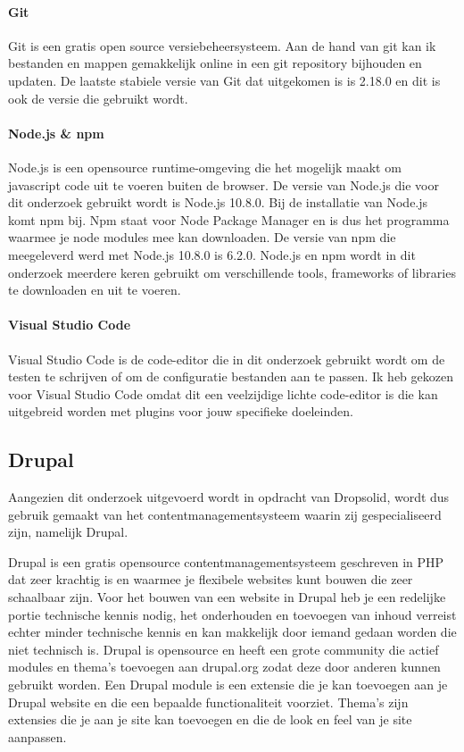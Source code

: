 \paragraph{Git}
Git is een gratis open source versiebeheersysteem. Aan de hand van git kan ik bestanden en mappen gemakkelijk online in een git repository bijhouden en updaten. De laatste stabiele versie van Git dat uitgekomen is is 2.18.0 en dit is ook de versie die gebruikt wordt.

\paragraph{Node.js \& npm}
Node.js is een opensource runtime-omgeving die het mogelijk maakt om javascript code uit te voeren buiten de browser. De versie van Node.js die voor dit onderzoek gebruikt wordt is Node.js 10.8.0. Bij de installatie van Node.js komt npm bij. Npm staat voor Node Package Manager en is dus het programma waarmee je node modules mee kan downloaden. De versie van npm die meegeleverd werd met Node.js 10.8.0 is 6.2.0. Node.js en npm wordt in dit onderzoek meerdere keren gebruikt om verschillende tools, frameworks of libraries te downloaden en uit te voeren.

\paragraph{Visual Studio Code}
Visual Studio Code is de code-editor die in dit onderzoek gebruikt wordt om de testen te schrijven of om de configuratie bestanden aan te passen. Ik heb gekozen voor Visual Studio Code omdat dit een veelzijdige lichte code-editor is die kan uitgebreid worden met plugins voor jouw specifieke doeleinden.

\subsection{Drupal}
Aangezien dit onderzoek uitgevoerd wordt in opdracht van Dropsolid, wordt dus gebruik gemaakt van het \gls{contentmanagementsysteem} waarin zij gespecialiseerd zijn, namelijk Drupal.

Drupal is een gratis opensource contentmanagementsysteem geschreven in PHP dat zeer krachtig is en waarmee je flexibele websites kunt bouwen die zeer schaalbaar zijn. Voor het bouwen van een website in Drupal heb je een redelijke portie technische kennis nodig, het onderhouden en toevoegen van inhoud verreist echter minder technische kennis en kan makkelijk door iemand gedaan worden die niet technisch is. Drupal is opensource en heeft een grote community die actief modules en thema's toevoegen aan drupal.org zodat deze door anderen kunnen gebruikt worden. Een Drupal module is een extensie die je kan toevoegen aan je Drupal website en die een bepaalde functionaliteit voorziet. Thema's zijn extensies die je aan je site kan toevoegen en die de look en feel van je site aanpassen.

